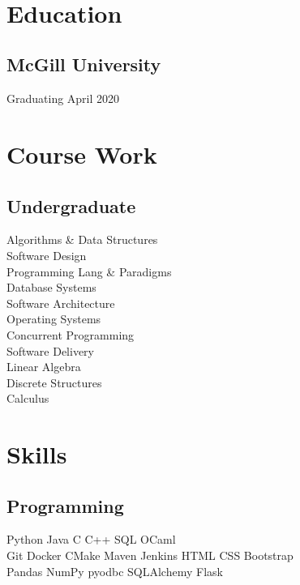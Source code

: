 \documentclass[]{willguthrie-resume}
\begin{document}
 
\header

\noindent\makebox[\linewidth]{\rule{0.94\paperwidth}{0.4pt}}

\hspace*{-\parindent}%
\begin{minipage}[t][][b]{0.33\textwidth}~

	\section{Education}
	\subsection{McGill University}
	Graduating April 2020
	\sectionsep

	\section{Course Work}
	\subsection{Undergraduate}
	Algorithms \& Data Structures \\
	Software Design \\
	Programming Lang \& Paradigms \\
	Database Systems \\
	Software Architecture \\
	Operating Systems \\
	Concurrent Programming \\
	Software Delivery \\
	Linear Algebra \\
	Discrete Structures \\
	Calculus \\
	\sectionsep

	\section{Skills}
	\subsection{Programming}
	Python \tb Java \tb C \tb C++ \tb SQL \tb OCaml \\
	Git \tb Docker \tb CMake \tb Maven \tb Jenkins \tb HTML \tb CSS \tb Bootstrap \\
	Pandas \tb NumPy \tb pyodbc \tb SQLAlchemy \tb Flask \\
	\sectionsep


\end{minipage}
\end{document}
